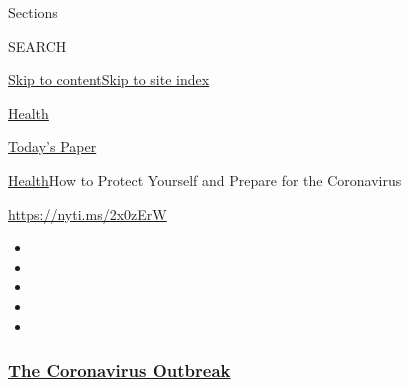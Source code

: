 Sections

SEARCH

\protect\hyperlink{site-content}{Skip to
content}\protect\hyperlink{site-index}{Skip to site index}

\href{https://www.nytimes3xbfgragh.onion/section/health}{Health}

\href{https://myaccount.nytimes3xbfgragh.onion/auth/login?response_type=cookie\&client_id=vi}{}

\href{https://www.nytimes3xbfgragh.onion/section/todayspaper}{Today's
Paper}

\href{/section/health}{Health}\textbar{}How to Protect Yourself and
Prepare for the Coronavirus

\url{https://nyti.ms/2x0zErW}

\begin{itemize}
\item
\item
\item
\item
\item
\end{itemize}

\hypertarget{the-coronavirus-outbreak}{%
\subsubsection{\texorpdfstring{\href{https://www.nytimes3xbfgragh.onion/news-event/coronavirus?name=styln-coronavirus\&region=TOP_BANNER\&block=storyline_menu_recirc\&action=click\&pgtype=Article\&impression_id=0a1cb000-efb6-11ea-9b73-5bf71047ff35\&variant=undefined}{The
Coronavirus
Outbreak}}{The Coronavirus Outbreak}}\label{the-coronavirus-outbreak}}

